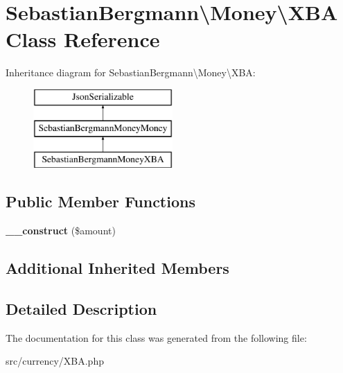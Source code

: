 \hypertarget{classSebastianBergmann_1_1Money_1_1XBA}{}\section{Sebastian\+Bergmann\textbackslash{}Money\textbackslash{}X\+B\+A Class Reference}
\label{classSebastianBergmann_1_1Money_1_1XBA}
Inheritance diagram for Sebastian\+Bergmann\textbackslash{}Money\textbackslash{}X\+B\+A\+:\begin{figure}[H]
\begin{center}
\leavevmode
\includegraphics[height=3.000000cm]{classSebastianBergmann_1_1Money_1_1XBA}
\end{center}
\end{figure}
\subsection*{Public Member Functions}
\begin{DoxyCompactItemize}
\item 
\hypertarget{classSebastianBergmann_1_1Money_1_1XBA_af4dea8ad5bb456aa3e9c98e7187a9ec2}{}{\bfseries \+\_\+\+\_\+construct} (\$amount)\label{classSebastianBergmann_1_1Money_1_1XBA_af4dea8ad5bb456aa3e9c98e7187a9ec2}

\end{DoxyCompactItemize}
\subsection*{Additional Inherited Members}


\subsection{Detailed Description}


The documentation for this class was generated from the following file\+:\begin{DoxyCompactItemize}
\item 
src/currency/X\+B\+A.\+php\end{DoxyCompactItemize}
